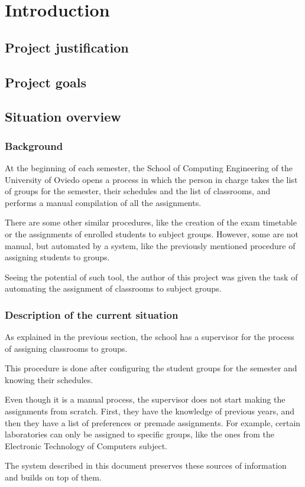 \renewcommand{\documentname}{Introduction}

\chapter{Introduction}


\section{Project justification}

\section{Project goals}

\section{Situation overview}

\subsection{Background}

At the beginning of each semester, the School of Computing Engineering of the University of Oviedo opens a process in which the person in charge takes the list of groups for the semester, their schedules and the list of classrooms, and performs a manual compilation of all the assignments.

There are some other similar procedures, like the creation of the exam timetable or the assignments of enrolled students to subject groups. However, some are not manual, but automated by a system, like the previously mentioned procedure of assigning students to groups.

Seeing the potential of such tool, the author of this project was given the task of automating the assignment of classrooms to subject groups. 

\subsection{Description of the current situation}

As explained in the previous section, the school has a supervisor for the process of assigning classrooms to groups.

This procedure is done after configuring the student groups for the semester and knowing their schedules.

Even though it is a manual process, the supervisor does not start making the assignments from scratch. First, they have the knowledge of previous years, and then they have a list of preferences or premade assignments. For example, certain laboratories can only be assigned to specific groups, like the ones from the Electronic Technology of Computers subject.

The system described in this document preserves these sources of information and builds on top of them.


